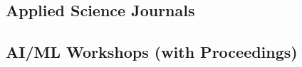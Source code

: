 \renewcommand*{\bibfont}{\small} %
\begin{refsection}
  \nocite{*}
  {%
    \setlength\bibitemsep{0pt} %
    \printbibliography[heading=none]
  }%
\end{refsection}


\subsection*{Applied Science Journals}

\renewcommand*{\bibfont}{\small} %
\begin{refsection}
  \nocite{*}
  {%
    \setlength\bibitemsep{0pt} %
    \printbibliography[heading=none]
  }%
\end{refsection}


\subsection*{AI/ML Workshops (with Proceedings)}

\renewcommand*{\bibfont}{\small} %
\begin{refsection}
  \nocite{*}
  {%
    \setlength\bibitemsep{0pt} %
    \printbibliography[heading=none]
  }%
\end{refsection}






